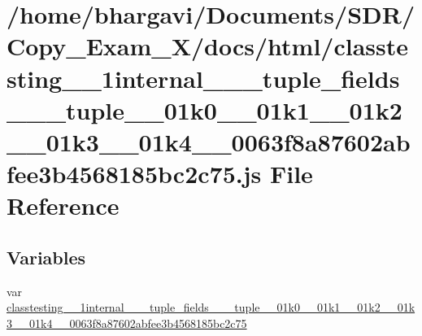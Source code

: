 \hypertarget{classtesting__1__1internal__1__1__tuple__fields__3__01__tuple__00__01k0__00__01k1__00__01k2__00_1955342aac4b7b94755221858083a4c0}{}\section{/home/bhargavi/\+Documents/\+S\+D\+R/\+Copy\+\_\+\+Exam\+\_\+X/docs/html/classtesting\+\_\+\_\+1internal\+\_\+\_\+\_\+tuple\+\_\+fields\+\_\+\_\+\_\+tuple\+\_\+\_\+01k0\+\_\+\_\+01k1\+\_\+\_\+01k2\+\_\+\_\+01k3\+\_\+\_\+01k4\+\_\+\_\+0063f8a87602abfee3b4568185bc2c75.js File Reference}
\label{classtesting__1__1internal__1__1__tuple__fields__3__01__tuple__00__01k0__00__01k1__00__01k2__00_1955342aac4b7b94755221858083a4c0}
\subsection*{Variables}
\begin{DoxyCompactItemize}
\item 
var \hyperlink{classtesting__1__1internal__1__1__tuple__fields__3__01__tuple__00__01k0__00__01k1__00__01k2__00_1955342aac4b7b94755221858083a4c0_a6188c16f4bab6f7d5f2c81d94b3dc7e6}{classtesting\+\_\+\_\+1internal\+\_\+\_\+\_\+tuple\+\_\+fields\+\_\+\_\+\_\+tuple\+\_\+\_\+01k0\+\_\+\_\+01k1\+\_\+\_\+01k2\+\_\+\_\+01k3\+\_\+\_\+01k4\+\_\+\_\+0063f8a87602abfee3b4568185bc2c75}
\end{DoxyCompactItemize}


